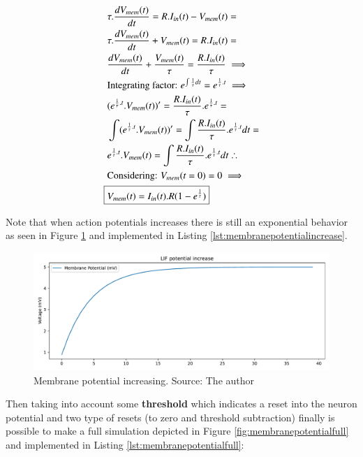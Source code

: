  			\begin{equation}
 				\label{eq:actionpotincrease}
 				\begin{aligned}
 					&\tau.\dfrac{dV_{mem}(t)}{dt} = R.I_{in}(t) - V_{mem}(t) = \\
 					&\tau.\dfrac{dV_{mem}(t)}{dt} + V_{mem}(t) = R.I_{in}(t) = \\
 					&\dfrac{dV_{mem}(t)}{dt} + \frac{V_{mem}(t)}{\tau} = \frac{R.I_{in}(t)}{\tau} \implies \\
 					&\text{Integrating factor: } e^{\int \frac{1}{\tau} dt} = e^{\frac{1}{\tau}.t} \implies \\
					&(e^{\frac{1}{\tau}.t}.V_{mem}(t))' = \frac{R.I_{in}(t)}{\tau}.e^{\frac{1}{\tau}.t} = \\
					&\int (e^{\frac{1}{\tau}.t}.V_{mem}(t))' = \int \frac{R.I_{in}(t)}{\tau}.e^{\frac{1}{\tau}.t} dt = \\
					&e^{\frac{1}{\tau}.t}.V_{mem}(t) = \int \frac{R.I_{in}(t)}{\tau}.e^{\frac{1}{\tau}.t} dt \therefore \\
					& \text{Considering: } V_{mem}(t=0) = 0 \implies \\
					\Aboxed{&V_{mem}(t) = I_{in}(t).R(1-e^{\frac{1}{\tau}})}
 				\end{aligned}
 			\end{equation}
 		
 			\par Note that when action potentials increases there is still an exponential behavior as seen in Figure \ref{fig:membranepotentialincrease} and implemented in Listing \ref{lst:membranepotentialincrease}.
 			
 			

 			\begin{figure}[H]
 				\centering
 				\includegraphics[width=0.7\linewidth]{images/membranePotentialIncrease}
 				\caption{Membrane potential increasing. Source: The author}
 				\label{fig:membranepotentialincrease}
 			\end{figure}
 		
 			\par Then taking into account some \textbf{threshold} which indicates a reset into the neuron potential and two type of resets (to zero and threshold subtraction) finally is possible to make a full simulation depicted in Figure \ref{fig:membranepotentialfull} and implemented in Listing \ref{lst:membranepotentialfull}:
 			
